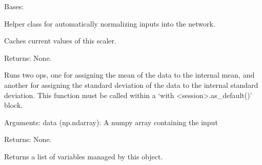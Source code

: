 \documentclass[letterpaper,10pt,english,openany,oneside]{sphinxmanual}
\begin{document}
\begin{fulllineitems}
\label{\detokenize{_modules/utils:utils.TensorStandardScaler.TensorStandardScaler}}
Bases: 

Helper class for automatically normalizing inputs into the network.

\begin{fulllineitems}
\label{\detokenize{_modules/utils:utils.TensorStandardScaler.TensorStandardScaler.cache}}
Caches current values of this scaler.

Returns: None.

\end{fulllineitems}


\begin{fulllineitems}
\label{\detokenize{_modules/utils:utils.TensorStandardScaler.TensorStandardScaler.fit}}
Runs two ops, one for assigning the mean of the data to the internal mean, and
another for assigning the standard deviation of the data to the internal standard deviation.
This function must be called within a ‘with \textless{}session\textgreater{}.as\_default()’ block.

Arguments:
data (np.ndarray): A numpy array containing the input

Returns: None.

\end{fulllineitems}


\begin{fulllineitems}
\label{\detokenize{_modules/utils:utils.TensorStandardScaler.TensorStandardScaler.get_vars}}
Returns a list of variables managed by this object.


\end{fulllineitems}
\end{fulllineitems}
\end{document}
